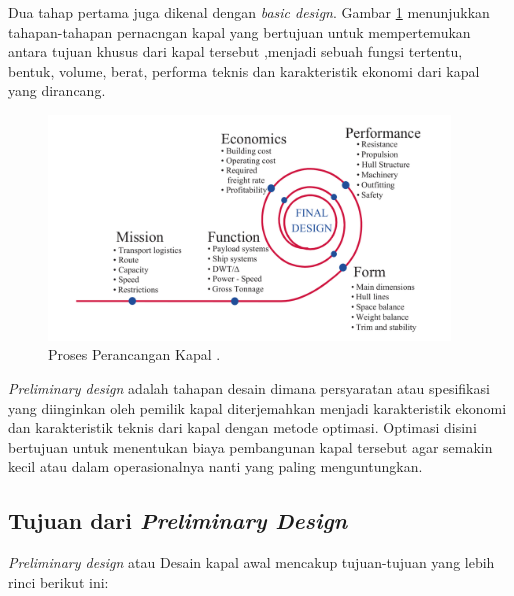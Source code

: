 Dua tahap pertama juga dikenal dengan \emph{basic design}. Gambar \ref{fig:tahap-deskap} menunjukkan tahapan-tahapan pernacngan kapal yang bertujuan untuk mempertemukan antara tujuan khusus dari kapal tersebut ,menjadi sebuah fungsi tertentu, bentuk, volume, berat, performa teknis dan karakteristik ekonomi dari kapal yang dirancang.

\begin{figure}[ht]
  \centering
  \includegraphics[width=0.95\textwidth,keepaspectratio]{gambar/ship design procedure.png}
  \caption{Proses Perancangan Kapal \citep{Levander_2003}.}
  \label{fig:tahap-deskap}
\end{figure}

\emph{Preliminary design} adalah tahapan desain dimana persyaratan atau spesifikasi yang diinginkan oleh pemilik kapal diterjemahkan menjadi karakteristik ekonomi dan karakteristik teknis dari kapal dengan metode optimasi. Optimasi disini bertujuan untuk menentukan biaya pembangunan kapal tersebut agar semakin kecil atau dalam operasionalnya nanti yang paling menguntungkan.
    

\subsection{Tujuan dari \emph{Preliminary Design}}
\label{subsec:tujuan-desain-awal}

\emph{Preliminary design} atau Desain kapal awal mencakup tujuan-tujuan yang lebih rinci berikut ini:

